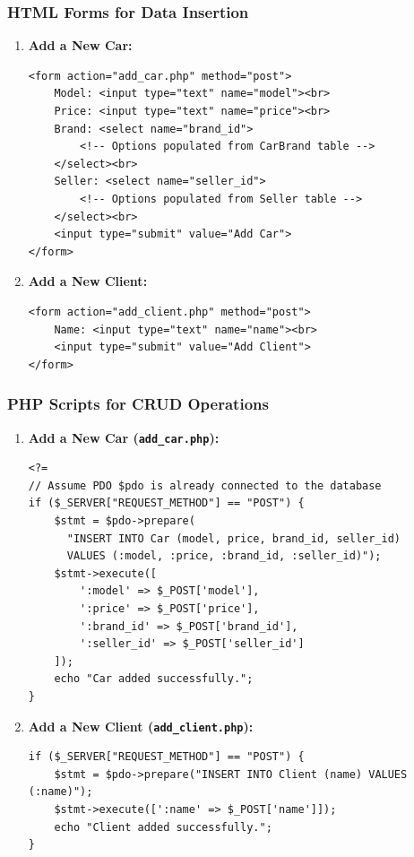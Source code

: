 \documentclass[11pt]{article}
\begin{document}
\subsubsection{HTML Forms for Data Insertion}
\label{sec:org8eb23f9}
\begin{enumerate}
\item \textbf{Add a New Car:}

\begin{verbatim}
<form action="add_car.php" method="post">
    Model: <input type="text" name="model"><br>
    Price: <input type="text" name="price"><br>
    Brand: <select name="brand_id">
        <!-- Options populated from CarBrand table -->
    </select><br>
    Seller: <select name="seller_id">
        <!-- Options populated from Seller table -->
    </select><br>
    <input type="submit" value="Add Car">
</form>
\end{verbatim}

\item \textbf{Add a New Client:}

\begin{verbatim}
<form action="add_client.php" method="post">
    Name: <input type="text" name="name"><br>
    <input type="submit" value="Add Client">
</form>
\end{verbatim}
\end{enumerate}

\subsubsection{PHP Scripts for CRUD Operations}
\label{sec:orgacb2d51}
\begin{enumerate}
\item \textbf{Add a New Car (\texttt{add\_car.php}):}

\begin{verbatim}
<?=
// Assume PDO $pdo is already connected to the database
if ($_SERVER["REQUEST_METHOD"] == "POST") {
    $stmt = $pdo->prepare(
      "INSERT INTO Car (model, price, brand_id, seller_id)
      VALUES (:model, :price, :brand_id, :seller_id)");
    $stmt->execute([
        ':model' => $_POST['model'],
        ':price' => $_POST['price'],
        ':brand_id' => $_POST['brand_id'],
        ':seller_id' => $_POST['seller_id']
    ]);
    echo "Car added successfully.";
}
\end{verbatim}

\item \textbf{Add a New Client (\texttt{add\_client.php}):}

\begin{verbatim}
if ($_SERVER["REQUEST_METHOD"] == "POST") {
    $stmt = $pdo->prepare("INSERT INTO Client (name) VALUES (:name)");
    $stmt->execute([':name' => $_POST['name']]);
    echo "Client added successfully.";
}
\end{verbatim}
\end{enumerate}
\end{document}
